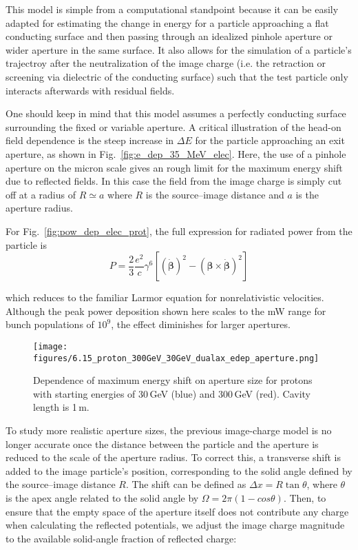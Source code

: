 \documentclass[reprint,
               amsmath,amssymb,nofootinbib, aps%
              ]{revtex4-2}
\begin{document}
This model is simple from a computational standpoint because it can be easily adapted for estimating the change in energy for a particle approaching a flat conducting surface and then passing through an idealized pinhole aperture or wider aperture in the same surface. It also allows for the simulation of a particle's trajectroy after the neutralization of the image charge (i.e. the retraction or screening via dielectric of the conducting surface) such that the test particle only interacts afterwards with residual fields. 

One should keep in mind that this model assumes a perfectly conducting surface surrounding the fixed or variable aperture. A critical illustration of the head-on field dependence is the steep increase in $\Delta E$ for the particle approaching an exit aperture, as shown in Fig.~\ref{fig:e_dep_35_MeV_elec}. Here, the use of a pinhole aperture on the micron scale gives an rough limit for the maximum energy shift due to reflected fields. In this case the field from the image charge is simply cut off at a radius of $R\simeq a$ where $R$ is the source--image distance and $a$ is the aperture radius.

For Fig.~\ref{fig:pow_dep_elec_prot}, the full expression for radiated power from the particle is
\begin{equation}
P=\frac{2}{3} \frac{e^2}{c} \gamma^6\left[(\dot{\boldsymbol{\beta}})^2-(\boldsymbol{\beta} \times \dot{\boldsymbol{\beta}})^2\right]
\label{eq:lw_power}
\end{equation}

\noindent which reduces to the familiar Larmor equation for nonrelativistic velocities. Although the peak power deposition shown here scales to the mW range for bunch populations of $10^9$, the effect diminishes for larger apertures.

\begin{figure}[ht!]
    \centering
    \texttt{[image: figures/6.15\_proton\_300GeV\_30GeV\_dualax\_edep\_aperture.png]}
    \caption{Dependence of maximum energy shift on aperture size for protons with starting energies of 30\,GeV (blue) and 300\,GeV (red). Cavity length is 1\,m.}
\label{fig:e_dep_apertures}
\end{figure}

To study more realistic aperture sizes, the previous image-charge model is no longer accurate once the distance between the particle and the aperture is reduced to the scale of the aperture radius. To correct this, a transverse shift is added to the image particle's position, corresponding to the solid angle defined by the source--image distance $R$. The shift can be defined as $\Delta x = R \operatorname{tan}\theta$, where $\theta$ is the apex angle related to the solid angle by $\Omega = 2\pi (1-cos\theta)$. Then, to ensure that the empty space of the aperture itself does not contribute any charge when calculating the reflected potentials, we adjust the image charge magnitude to the available solid-angle fraction of reflected charge:
\end{document}
